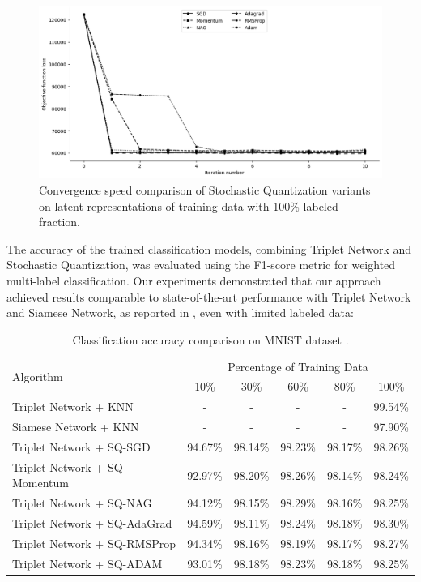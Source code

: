 \begin{figure}
    \centering
    \includegraphics[width=\textwidth]{figures/sq_convergence_full_dataset.png}
    \caption{Convergence speed comparison of Stochastic Quantization variants on latent representations of training data with 100\% labeled fraction.}
    \label{convergence:fig}
\end{figure}

The accuracy of the trained classification models, combining Triplet Network and Stochastic Quantization, was evaluated using the F1-score metric \cite{Chinchor_1992} for weighted multi-label classification. Our experiments demonstrated that our approach achieved results comparable to state-of-the-art performance with Triplet Network and Siamese Network, as reported in \cite{Hoffer_2015}, even with limited labeled data:
\begin{table}
\caption{Classification accuracy comparison on MNIST dataset \cite{lecun2010mnist}.}
\label{accuracy:table}
    \begin{tabularx}{\textwidth}{|X|*{5}{c|}}
        \hline
        \multirow{2}{*}{Algorithm} & \multicolumn{5}{c|}{Percentage of Training Data} \\
        \cline{2-6}
        & 10\% & 30\% & 60\% & 80\% & 100\% \\
        \hline
        Triplet Network + KNN         & - & - & - & - & 99.54\% \\
        Siamese Network + KNN         & - & - & - & - & 97.90\% \\
        Triplet Network + SQ-SGD      & 94.67\% & 98.14\% & 98.23\% & 98.17\% & 98.26\% \\
        Triplet Network + SQ-Momentum & 92.97\% & 98.20\% & 98.26\% & 98.14\% & 98.24\% \\
        Triplet Network + SQ-NAG      & 94.12\% & 98.15\% & 98.29\% & 98.16\% & 98.25\% \\
        Triplet Network + SQ-AdaGrad  & 94.59\% & 98.11\% & 98.24\% & 98.18\% & 98.30\% \\
        Triplet Network + SQ-RMSProp  & 94.34\% & 98.16\% & 98.19\% & 98.17\% & 98.27\% \\
        Triplet Network + SQ-ADAM     & 93.01\% & 98.18\% & 98.23\% & 98.18\% & 98.25\% \\
        \hline
    \end{tabularx}
\end{table}
